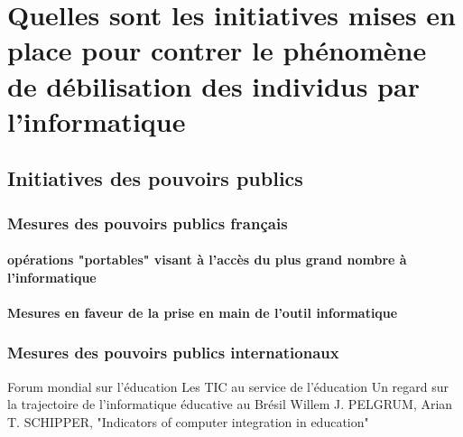 
\chapter{Quelles sont les initiatives mises en place pour contrer le phénomène de débilisation des individus par l'informatique}\label{initiatives_actuelles}

\section{Initiatives des pouvoirs publics}

\subsection{Mesures des pouvoirs publics français}

\subsubsection{opérations "portables" visant à l'accès du plus grand nombre à l'informatique}
\cite{portables35}
\cite{portables60}
\cite{portables40}

\subsubsection{Mesures en faveur de la prise en main de l'outil informatique}
\cite{b2i_c2i}
\cite{b2i}
\cite{isn}
    


\subsection{Mesures des pouvoirs publics internationaux}
Forum mondial sur l’éducation \cite{educ_forum}
Les TIC au service de l’éducation \cite{tics}
Un regard sur la trajectoire de l’informatique éducative au Brésil \cite{peixoto2006regard}
Willem J. PELGRUM, Arian T. SCHIPPER, "Indicators of computer integration in education" \cite{pelgrum1993indicators}


